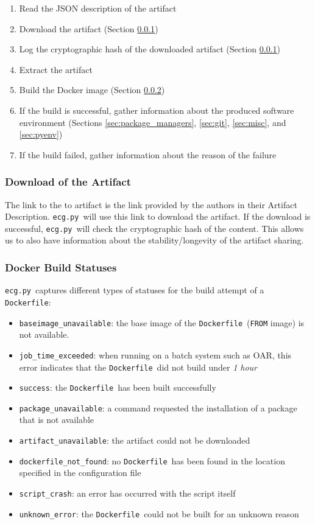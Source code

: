 \documentclass{article}
\newcommand{\noteqg}{\todo[backgroundcolor=blue!10,bordercolor=blue,inline,caption={}]}
\newcommand{\dfile}{\texttt{Dockerfile}}
\newcommand{\ecg}{\texttt{ecg.py}}
\begin{document}
\begin{enumerate}
\item Read the JSON description of the artifact
\item Download the artifact (Section \ref{sec:download})
\item Log the cryptographic hash of the downloaded artifact (Section \ref{sec:download})
\item Extract the artifact
\item Build the Docker image (Section \ref{sec:docker_build})
\item If the build is successful, gather information about the produced software environment (Sections \ref{sec:package_managers}, \ref{sec:git}, \ref{sec:misc}, and \ref{sec:pyenv})
\item If the build failed, gather information about the reason of the failure
\end{enumerate}

\noteqg{should probably be a flowgraph}

\subsubsection{Download of the Artifact}\label{sec:download}

The link to the to artifact is the link provided by the authors in their Artifact Description.
\ecg\ will use this link to download the artifact.
If the download is successful, \ecg\ will check the cryptographic hash of the content.
This allows us to also have information about the stability/longevity of the artifact sharing.

\subsubsection{Docker Build Statuses}\label{sec:docker_build}

\ecg\ captures different types of statuses for the build attempt of a \dfile:

\begin{itemize}
  \item \texttt{baseimage\_unavailable}: the base image of the \dfile\ (\texttt{FROM} image) is not available.
  \item \texttt{job\_time\_exceeded}: when running on a batch system such as OAR, this error indicates that the \dfile\ did not build under \emph{1 hour}
  \item \texttt{success}: the \dfile\ has been built successfully
  \item \texttt{package\_unavailable}: a command requested the installation of a package that is not available
  \item \texttt{artifact_unavailable}: the artifact could not be downloaded
  \item \texttt{dockerfile_not_found}: no \dfile\ has been found in the location specified in the configuration file
  \item \texttt{script_crash}: an error has occurred with the script itself
  \item \texttt{unknown_error}: the \dfile\ could not be built for an unknown reason
\end{itemize}
\end{document}

